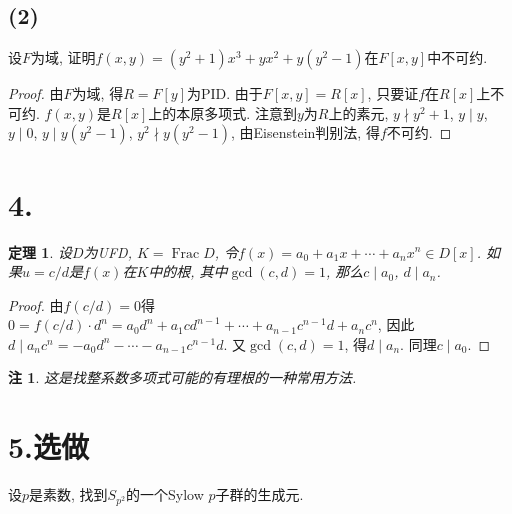 \documentclass[12pt, a4paper, fontset=windows]{ctexart}
\newcommand{\Frac}{\operatorname{Frac}}
\newcommand{\xuan}{{\normalsize 选做}}
\newtheorem*{remark}{注}
\newtheorem*{theorem}{定理}
\begin{document}
\subsection*{(2)}

设$F$为域, 证明$f(x,y)=(y^2+1)x^3+yx^2+y(y^2-1)$在$F[x,y]$中不可约. 

\begin{proof}
由$F$为域, 得$R=F[y]$为PID. 由于$F[x,y]=R[x]$, 只要证$f$在$R[x]$上不可约. 
$f(x,y)$是$R[x]$上的本原多项式. 注意到$y$为$R$上的素元, $y\nmid y^2+1$, $y\mid y$, $y\mid 0$, 
$y\mid y(y^2-1)$, $y^2\nmid y(y^2-1)$, 由Eisenstein判别法, 得$f$不可约. 
\end{proof}

\section*{4.}
\label{Q-root}

\begin{theorem}
设$D$为{\rm UFD}, $K=\Frac D$, 令$f(x)=a_0+a_1x+\cdots+a_nx^n\in D[x]$. 
如果$u=c/d$是$f(x)$在$K$中的根, 其中$\gcd(c,d)=1$, 那么$c\mid a_0$, $d\mid a_n$. 
\end{theorem}

\begin{proof}
由$f(c/d)=0$得$0=f(c/d)\cdot d^n=a_0d^n+a_1cd^{n-1}+\cdots+a_{n-1}c^{n-1}d+a_nc^n$, 
因此$d\mid a_nc^n=-a_0d^n-\cdots-a_{n-1}c^{n-1}d$. 又$\gcd(c,d)=1$, 
得$d\mid a_n$. 同理$c\mid a_0$. 
\end{proof}

\begin{remark}
这是找整系数多项式可能的有理根的一种常用方法. 
\end{remark}

\section*{5.\xuan}
\label{Sp2-wr}

设$p$是素数, 找到$S_{p^2}$的一个Sylow $p$子群的生成元. 
\end{document}
